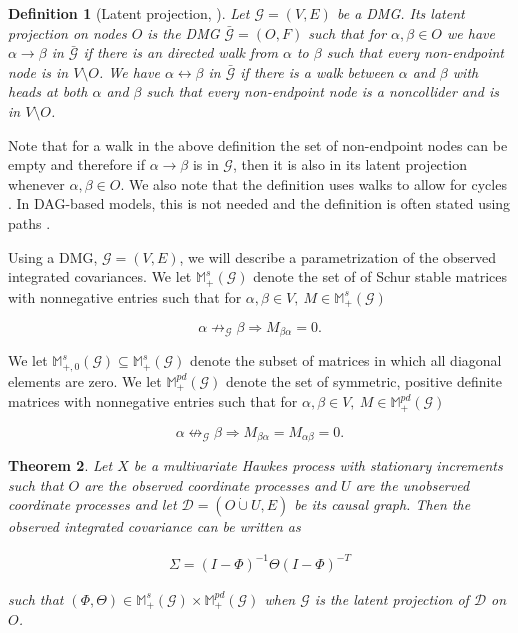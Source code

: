 \documentclass[accepted]{uai2021} %
\newtheorem{thm}{Theorem}
\newtheorem{defn}[thm]{Definition}
\newcommand{\disjU}{\mathbin{\dot{\cup}}}
\begin{document}
\begin{defn}[Latent projection, \cite{vermaEquiAndSynthesis,richardson2017}]
	\label{def:latProj}
	Let $\mathcal{G} = (V,E)$ be a DMG. Its latent projection on nodes $O$ is 
	the DMG $\bar{\mathcal{G}} = (O,F)$ such that for $\alpha,\beta\in O$ we 
	have $\alpha\rightarrow\beta$ in $\bar{\mathcal{G}}$ if there is an 
	directed walk from $\alpha$ to $\beta$ such that every non-endpoint node is 
	in $V\setminus O$. We have 
	$\alpha\leftrightarrow\beta$ in $\bar{\mathcal{G}}$ if there is a walk 
	between $\alpha$ and $\beta$ with heads at 
	both $\alpha$ and $\beta$ such that every non-endpoint node is a 
	noncollider and is in 
	$V\setminus O$.
\end{defn}

Note that for a walk in the above definition the set of non-endpoint nodes can 
be empty and therefore if $\alpha\rightarrow\beta$ is in $\mathcal{G}$, then it 
is 
also in its latent projection whenever $\alpha,\beta\in O$. We also note that 
the definition uses walks to 
allow for cycles \citep{mogensen2018}. In DAG-based models, this is 
not needed 
and the definition is often stated using paths 
\citep{richardson2017}.

Using a DMG, $\mathcal{G} = (V,E)$, we will describe a parametrization of the 
observed integrated covariances. We let $\mathbb{M}_+^s(\mathcal{G})$ denote 
the set of of Schur stable matrices with nonnegative entries such that for 
$\alpha,\beta\in V,\ M 
\in \mathbb{M}_+^s(\mathcal{G})$

$$
\alpha\not\rightarrow_\mathcal{G}\beta \Rightarrow M_{\beta\alpha} = 0.
$$

We let $\mathbb{M}_{+,0}^s(\mathcal{G})\subseteq 
\mathbb{M}_+^s(\mathcal{G})$ denote the subset of matrices in which all 
diagonal 
elements are zero.
We let $\mathbb{M}_+^{pd}(\mathcal{G})$ denote the set of symmetric, positive 
definite matrices with nonnegative entries such that for $\alpha,\beta\in V, \ 
M\in \mathbb{M}_+^{pd}(\mathcal{G})$

$$
\alpha\not \leftrightarrow_\mathcal{G} \beta \Rightarrow M_{\beta\alpha} = 
M_{\alpha\beta} = 0.
$$

\begin{thm}

	Let $X$ be a multivariate Hawkes process with stationary increments such 
	that $O$ are the 
	observed 
	coordinate processes and $U$ are the unobserved coordinate processes and 
	let $\mathcal{D} = (O \disjU U, E)$ be its causal graph. Then the observed 
	integrated 
	covariance can be written as
	
	\begin{align}
	\Sigma = (I - \Phi)^{-1} \Theta (I - \Phi)^{-T}
	\label{eq:margThm}
	\end{align}
	

	
	\noindent such that $(\Phi, \Theta) \in \mathbb{M}_+^s(\mathcal{G}) \times 
	\mathbb{M}_+^{pd}(\mathcal{G})$ when $\mathcal{G}$ is the latent projection 
	of $\mathcal{D}$ on $O$.
	
	\label{thm:marg}
\end{thm}
	
\end{document}
